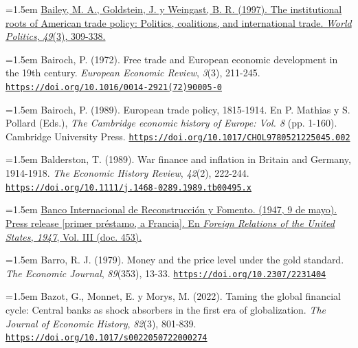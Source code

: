 \documentclass[10pt,a4paper]{article}
\begin{document}
{\sloppy\noindent\hangindent=1.5em \href{https://core-prod.cambridgecore.org/core/journals/world-politics/article/institutional-roots-of-american-trade-policy-politics-coalitions-and-international-trade/8905528F9C4B5C1A2332C789A3B54595}{Bailey, M. A., Goldstein, J. y Weingast, B. R. (1997). The institutional roots of American trade policy: Politics, coalitions, and international trade. \textit{World Politics}, \textit{49}(3), 309-338.}\par}

{\sloppy\noindent\hangindent=1.5em Bairoch, P. (1972). Free trade and European economic development in the 19th century. \textit{European Economic Review}, \textit{3}(3), 211-245. \href{https://doi.org/10.1016/0014-2921(72)90005-0}{\nolinkurl{https://doi.org/10.1016/0014-2921(72)90005-0}}\par}

{\sloppy\noindent\hangindent=1.5em Bairoch, P. (1989). European trade policy, 1815-1914. En P. Mathias y S. Pollard (Eds.), \textit{The Cambridge economic history of Europe: Vol. 8} (pp. 1-160). Cambridge University Press. \href{https://doi.org/10.1017/CHOL9780521225045.002}{\nolinkurl{https://doi.org/10.1017/CHOL9780521225045.002}}\par}

{\sloppy\noindent\hangindent=1.5em Balderston, T. (1989). War finance and inflation in Britain and Germany, 1914-1918. \textit{The Economic History Review}, \textit{42}(2), 222-244. \href{https://doi.org/10.1111/j.1468-0289.1989.tb00495.x}{\nolinkurl{https://doi.org/10.1111/j.1468-0289.1989.tb00495.x}}\par}

{\sloppy\noindent\hangindent=1.5em \href{https://history.state.gov/historicaldocuments/frus1947v03/d453}{Banco Internacional de Reconstrucción y Fomento. (1947, 9 de mayo). Press release [primer préstamo, a Francia]. En \textit{Foreign Relations of the United States, 1947}, Vol. III (doc. 453).}\par}

{\sloppy\noindent\hangindent=1.5em Barro, R. J. (1979). Money and the price level under the gold standard. \textit{The Economic Journal}, \textit{89}(353), 13-33. \href{https://doi.org/10.2307/2231404}{\nolinkurl{https://doi.org/10.2307/2231404}}\par}

{\sloppy\noindent\hangindent=1.5em Bazot, G., Monnet, E. y Morys, M. (2022). Taming the global financial cycle: Central banks as shock absorbers in the first era of globalization. \textit{The Journal of Economic History}, \textit{82}(3), 801-839. \href{https://doi.org/10.1017/s0022050722000274}{\nolinkurl{https://doi.org/10.1017/s0022050722000274}}\par}
\end{document}
